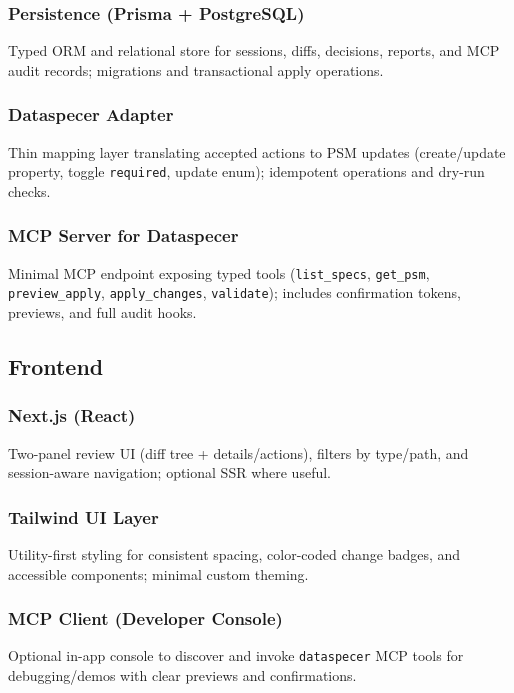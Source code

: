 \subsubsection*{Persistence (Prisma + PostgreSQL) \cite{prisma,postgres}}
Typed ORM and relational store for sessions, diffs, decisions, reports, and MCP audit records; migrations and transactional apply operations.

\subsubsection*{Dataspecer Adapter}
Thin mapping layer translating accepted actions to PSM updates (create/update property, toggle \texttt{required}, update enum); idempotent operations and dry-run checks.

\subsubsection*{MCP Server for Dataspecer \cite{mcp}}
Minimal MCP endpoint exposing typed tools (\texttt{list\_specs}, \texttt{get\_psm}, \texttt{preview\_apply}, \texttt{apply\_changes}, \texttt{validate}); includes confirmation tokens, previews, and full audit hooks.

\subsection*{Frontend}
\subsubsection*{Next.js (React) \cite{nextjs,react}}
Two-panel review UI (diff tree + details/actions), filters by type/path, and session-aware navigation; optional SSR where useful.

\subsubsection*{Tailwind UI Layer \cite{tailwind}}
Utility-first styling for consistent spacing, color-coded change badges, and accessible components; minimal custom theming.

\subsubsection*{MCP Client (Developer Console) \cite{mcp}}
Optional in-app console to discover and invoke \texttt{dataspecer} MCP tools for debugging/demos with clear previews and confirmations.

